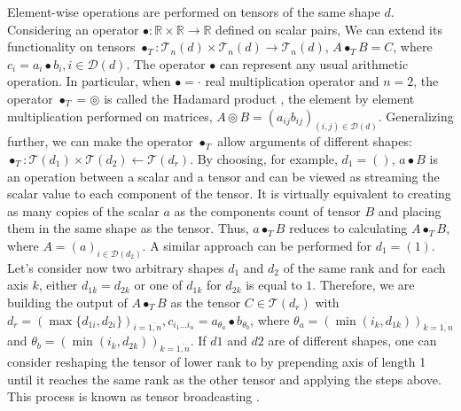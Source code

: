 \par Element-wise operations are performed on tensors of the same shape $d$. Considering an operator $ \bullet : \mathbb{R} \times \mathbb{R} \rightarrow \mathbb{R}$ defined on scalar pairs, We can extend its functionality on tensors $ \bullet_T : \mathcal{T}_{n}(d) \times \mathcal{T}_{n}(d) \rightarrow \mathcal{T}_{n}(d)$, $A \bullet_T B = C$, where $c_i = a_i \bullet b_i, i \in \mathcal{D}(d)$. The operator $\bullet$ can represent any usual arithmetic operation. In particular, when $\bullet=\cdot$ real multiplication operator and $n=2$, the operator $\bullet_T = \circledcirc$  is called the Hadamard product \cite{D2l}, the element by element multiplication performed on matrices, $A \circledcirc B = (a_{i j} b_{i j})_{(i,j)\in \mathcal{D}(d)}$. Generalizing further, we can make the operator $\bullet_T$ allow arguments of different shapes: $\bullet_T : \mathcal{T}(d_1) \times \mathcal{T}(d_2)\leftarrow \mathcal{T}(d_r)$. By choosing, for example, $d_1=()$, $a \bullet B$ is an operation between a scalar and a tensor and can be viewed as streaming the scalar value to each component of the tensor. It is virtually equivalent to creating as many copies of the scalar $a$ as the components count of tensor $B$ and placing them in the same shape as the tensor. Thus, $a \bullet_T B$ reduces to calculating $A \bullet_T B$, where $A=(a)_{i\in \mathcal{D}(d_2)}$. A similar approach can be performed for $d_1=(1)$. Let's consider now two arbitrary shapes $d_1$ and $d_2$ of the same rank and for each axis $k$, either $d_{1 k} = d_{2 k}$ or one of $d_{1 k}$ for ${d_{2 k}}$ is equal to ${1}$. Therefore, we are building the output of $A \bullet_T B$ as the tensor $C \in \mathcal{T}(d_r)$ with $d_r=(\max{\{d_{1 i}, {d_{2 i}\}}})_{i=\overline{1,n}}, c_{i_1 \ldots i_n} = a_{\theta_a} \bullet b_{\theta_b}$, where $\theta_a = (\min{(i_k, d_{1 k})})_{k=\overline{1,n}}$ and $\theta_b = (\min{(i_k, d_{2 k})})_{k=\overline{1,n}}$. If $d1$ and $d2$ are of different shapes, one can consider reshaping the tensor of lower rank to by prepending axis of length 1 until it reaches the same rank as the other tensor and applying the steps above. This process is known as tensor broadcasting \cite{Numpy}.

